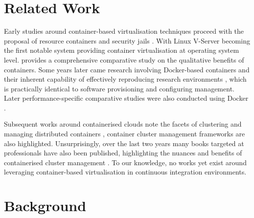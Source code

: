 \documentclass[journal]{IEEEtran}
\begin{document}
\section{Related Work}
Early studies around container-based virtualisation techniques
proceed with the proposal of resource containers \citep{Banga} and security
jails \citep{Kamp}.  With Linux V-Server becoming the first notable system providing
container virtualisation at operating system level.
\citet{Soltesz} provides a comprehensive comparative 
study on the qualitative benefits of containers. Some years later
came research involving Docker-based containers and their inherent capability of effectively
reproducing research environments \citep{Boettiger}, which is practically
identical to software provisioning 
and configuring management. Later performance-specific comparative studies were also conducted 
using Docker \citep{Agarwal}.
\par
Subsequent works around containerised clouds note 
the facets of clustering and managing distributed containers \citep{Claus, Verma}, container 
cluster management frameworks are also highlighted. 
Unsurprisingly, over the last two years many books targeted at professionals
have also been  
published, highlighting the nuances and benefits of containerised cluster management
\citep{db, holla, Rensin, Brewer}. To our knowledge, no works yet exist around
leveraging container-based virtualisation in continuous integration environments.  

\section{Background}
\end{document}
